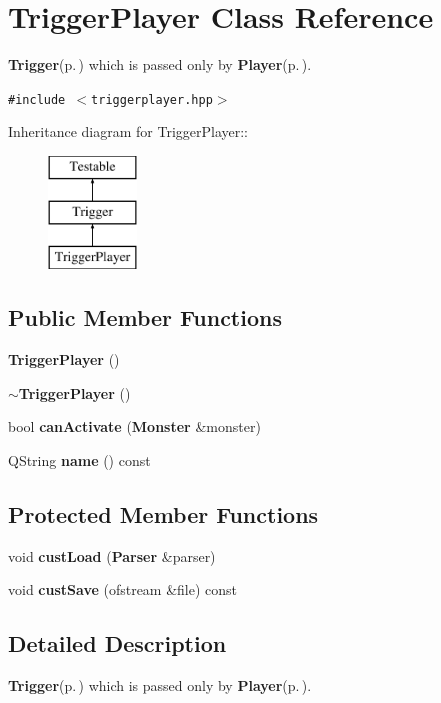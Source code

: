\section{Trigger\-Player Class Reference}
\label{classTriggerPlayer}
{\bf Trigger}{\rm (p.\,\pageref{classTrigger})} which is passed only by {\bf Player}{\rm (p.\,\pageref{classPlayer})}.  


{\tt \#include $<$triggerplayer.hpp$>$}

Inheritance diagram for Trigger\-Player::\begin{figure}[H]
\begin{center}
\leavevmode
\includegraphics[height=3cm]{classTriggerPlayer}
\end{center}
\end{figure}
\subsection*{Public Member Functions}
\begin{CompactItemize}
\item 
{\bf Trigger\-Player} ()
\item 
{\bf $\sim$Trigger\-Player} ()
\item 
bool {\bf can\-Activate} ({\bf Monster} \&monster)
\item 
QString {\bf name} () const 
\end{CompactItemize}
\subsection*{Protected Member Functions}
\begin{CompactItemize}
\item 
void {\bf cust\-Load} ({\bf Parser} \&parser)
\item 
void {\bf cust\-Save} (ofstream \&file) const 
\end{CompactItemize}


\subsection{Detailed Description}
{\bf Trigger}{\rm (p.\,\pageref{classTrigger})} which is passed only by {\bf Player}{\rm (p.\,\pageref{classPlayer})}. 




